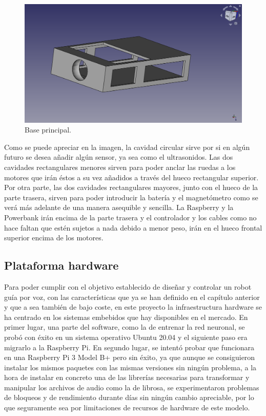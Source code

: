 \begin{figure}[H]
  \centering
  \includegraphics[scale=0.25]{figs/base} %
  \caption{Base principal.}
  \label{fig:Base_principal}
\end{figure}

Como se puede apreciar en la imagen, la cavidad circular sirve por si en algún futuro se desea añadir algún sensor, ya sea como el ultrasonidos. Las dos cavidades rectangulares menores sirven para poder anclar las ruedas a los motores que irán éstos a su vez añadidos a través del hueco rectangular superior. Por otra parte, las dos cavidades rectangulares mayores, junto con el hueco de la parte trasera, sirven para poder introducir la batería y el magnetómetro como se verá más adelante de una manera asequible y sencilla. La Raspberry y la Powerbank irán encima de la parte trasera y el controlador y los cables como no hace faltan que estén sujetos a nada debido a menor peso, irán en el hueco frontal superior encima de los motores.


\subsection{Plataforma hardware}
\label{subsec:plataforma_hardware}


Para poder cumplir con el objetivo establecido de diseñar y controlar un robot guía por voz, con las características que ya se han definido en el capítulo anterior y que a sea también de bajo coste, en este proyecto la infraestructura hardware se ha centrado en los sistemas embebidos que hay disponibles en el mercado. En primer lugar, una parte del software, como la de entrenar la red neuronal, se probó con éxito en un sistema operativo Ubuntu 20.04 y el siguiente paso era migrarlo a la Raspberry Pi. En segundo lugar, se intentó probar que funcionara en una Raspberry Pi 3 Model B+ pero sin éxito, ya que aunque se consiguieron instalar los mismos paquetes con las mismas versiones sin ningún problema, a la hora de instalar en concreto una de las librerías necesarias para transformar y manipular los archivos de audio como la de librosa, se experimentaron problemas de bloqueos y de rendimiento durante días sin ningún cambio apreciable, por lo que seguramente sea por limitaciones de recursos de hardware de este modelo.\\

